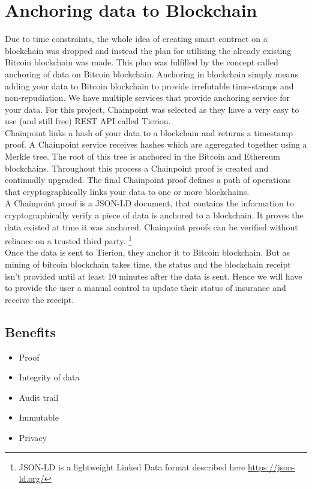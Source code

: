 \section{Anchoring data to Blockchain}
Due to time constraints, the whole idea of creating smart contract on a blockchain was dropped and instead the plan for utilising the already existing Bitcoin blockchain was made. This plan was fulfilled by the concept called anchoring of data on Bitcoin blockchain. Anchoring in blockchain simply means adding your data to Bitcoin blockchain to provide irrefutable time-stamps and non-repudiation. 
We have multiple services that provide anchoring service for your data. For this project, Chainpoint was selected as they have a very easy to use (and still free) REST API called Tierion.
\\Chainpoint links a hash of your data to a blockchain and returns a timestamp proof. A Chainpoint service receives hashes which are aggregated together using a Merkle tree. The root of this tree is anchored in the Bitcoin and Ethereum blockchains. Throughout this process a Chainpoint proof is created and continually upgraded. The final Chainpoint proof defines a path of operations that cryptographically links your data to one or more blockchains.\cite{ChainpointStandard}
\\A Chainpoint proof is a JSON-LD document, that contains the information to cryptographically verify a piece of data is anchored to a blockchain. It proves the data existed at time it was anchored. Chainpoint proofs can be verified without reliance on a trusted third party.
\footnote{JSON-LD is a lightweight Linked Data format described here \url{https://json-ld.org/}}
\\Once the data is sent to Tierion, they anchor it to Bitcoin blockchain. But as mining of bitcoin blockchain takes time, the status and the blockchain receipt isn't provided until at least 10 minutes after the data is sent. Hence we will have to provide the user a manual control to update their status of insurance and receive the receipt.

\subsection{Benefits}
\begin{itemize}
    \item Proof
    \item Integrity of data
    \item Audit trail
    \item Immutable
    \item Privacy
\end{itemize}

